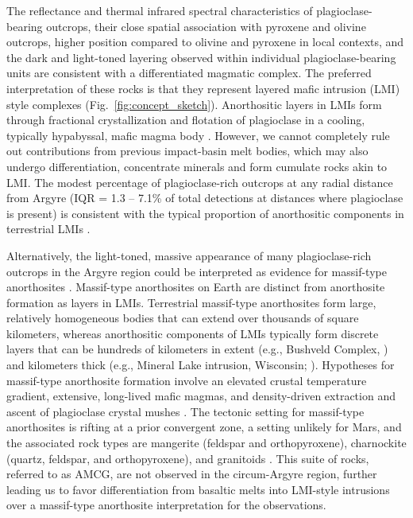 \documentclass[11pt]{article}
\begin{document}
The reflectance and thermal infrared spectral characteristics of plagioclase-bearing outcrops, their close spatial association with pyroxene and olivine outcrops, higher position compared to olivine and pyroxene in local contexts, and the dark and light-toned layering observed within individual plagioclase-bearing units are consistent with a differentiated magmatic complex. The preferred interpretation of these rocks is that they represent layered mafic intrusion (LMI) style complexes (Fig.~\ref{fig:concept_sketch}). Anorthositic layers in LMIs form through fractional crystallization and flotation of plagioclase in a cooling, typically hypabyssal, mafic magma body \citep{Ashwal1993}. However, we cannot completely rule out contributions from previous impact-basin melt bodies, which may also undergo differentiation, concentrate minerals and form cumulate rocks akin to LMI. The modest percentage of plagioclase-rich outcrops at any radial distance from Argyre (IQR = 1.3 -- 7.1\% of total detections at distances where plagioclase is present) is consistent with the typical proportion of anorthositic components in terrestrial LMIs \citep{Ashwal1993, Ashwal2021}.

Alternatively, the light-toned, massive appearance of many plagioclase-rich outcrops in the Argyre region could be interpreted as evidence for massif-type anorthosites \citep{Ashwal1993, Arndt2013, Keller2024}. Massif-type anorthosites on Earth are distinct from anorthosite formation as layers in LMIs. Terrestrial massif-type anorthosites form large, relatively homogeneous bodies that can extend over thousands of square kilometers, whereas anorthositic components of LMIs typically form discrete layers that can be hundreds of kilometers in extent (e.g., Bushveld Complex, \citealt{Latypov2020}) and kilometers thick (e.g., Mineral Lake intrusion, Wisconsin; \citealt{Ashwal1993}). Hypotheses for massif-type anorthosite formation involve an elevated crustal temperature gradient, extensive, long-lived mafic magmas, and density-driven extraction and ascent of plagioclase crystal mushes \citep{Emslie1994, Keller2024}. The tectonic setting for massif-type anorthosites is rifting at a prior convergent zone, a setting unlikely for Mars, and the associated rock types are mangerite (feldspar and orthopyroxene), charnockite (quartz, feldspar, and orthopyroxene), and granitoids \citep{Emslie1994, Hamilton2010, Arndt2013, Keller2024}. This suite of rocks, referred to as AMCG, are not observed in the circum-Argyre region, further leading us to favor differentiation from basaltic melts into LMI-style intrusions over a massif-type anorthosite interpretation for the observations.
\end{document}
